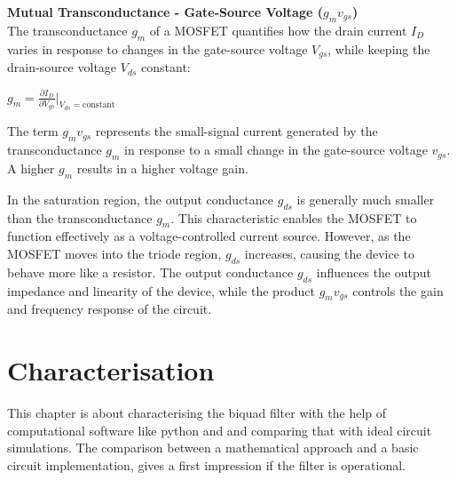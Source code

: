 \documentclass[
  letterpaper,
]{scrbook}
\begin{document}
\textbf{Mutual Transconductance - Gate-Source Voltage (\(g_mv_{gs}\))}\\
The transconductance \(g_m\) of a MOSFET quantifies how the drain
current \(I_D\) varies in response to changes in the gate-source voltage
\(V_{gs}\), while keeping the drain-source voltage \(V_{ds}\) constant:

\(g_m=\frac{\partial I_D}{\partial V_{gs}}\bigg|_{V_{ds}=\text{constant}}\)

The term \(g_mv_{gs}\) represents the small-signal current generated by
the transconductance \(g_m\) in response to a small change in the
gate-source voltage \(v_{gs}\). A higher \(g_m\) results in a higher
voltage gain.

\begin{tcolorbox}[enhanced jigsaw, title=\textcolor{quarto-callout-note-color}{\faInfo}\hspace{0.5em}{Summary of \(g_mv_{gs}\)}, colback=white, bottomrule=.15mm, coltitle=black, colbacktitle=quarto-callout-note-color!10!white, toptitle=1mm, colframe=quarto-callout-note-color-frame, rightrule=.15mm, arc=.35mm, leftrule=.75mm, bottomtitle=1mm, titlerule=0mm, toprule=.15mm, opacitybacktitle=0.6, opacityback=0, left=2mm, breakable]

In the saturation region, the output conductance \(g_{ds}\) is generally
much smaller than the transconductance \(g_m\). This characteristic
enables the MOSFET to function effectively as a voltage-controlled
current source. However, as the MOSFET moves into the triode region,
\(g_{ds}\) increases, causing the device to behave more like a resistor.
The output conductance \(g_{ds}\) influences the output impedance and
linearity of the device, while the product \(g_mv_{gs}\) controls the
gain and frequency response of the circuit.

\end{tcolorbox}


\chapter{Characterisation}\label{characterisation}

This chapter is about characterising the biquad filter with the help of
computational software like python and and comparing that with ideal
circuit simulations. The comparison between a mathematical approach and
a basic circuit implementation, gives a first impression if the filter
is operational.
\end{document}
